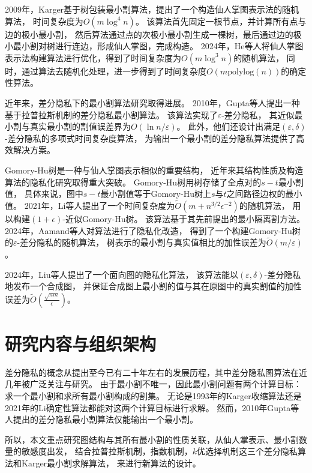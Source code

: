 2009年，Karger基于树包装最小割算法，提出了一个构造仙人掌图表示法的随机算法，
时间复杂度为$O(m\log^4n)$。\cite{karger2009near}
该算法首先固定一根节点，并计算所有点与边的极小最小割，
然后算法通过点的次极小最小割生成一棵树，最后通过边的极小最小割对树进行连边，形成仙人掌图，完成构造。
2024年，He等人将仙人掌图表示法构建算法进行优化，得到了时间复杂度为$O(m\log^3n)$的随机算法，
同时，通过算法去随机化处理，进一步得到了时间复杂度$O(m\text{polylog}(n))$的确定性算法。\cite{he2024cactus}

近年来，差分隐私下的最小割算法研究取得进展。
2010年，Gupta等人提出一种基于拉普拉斯机制的差分隐私最小割算法。\cite{gupta2010differentially}
该算法实现了$\varepsilon$-差分隐私，
其近似最小割与真实最小割的割值误差界为$O(\ln n/\varepsilon)$。
此外，他们还设计出满足$(\varepsilon,\delta)$-差分隐私的多项式时间复杂度算法，
为输出一个最小割的差分隐私算法提供了高效解决方案。

Gomory-Hu树是一种与仙人掌图表示相似的重要结构，
近年来其结构性质及构造算法的隐私化研究取得重大突破。
Gomory-Hu树用树存储了全点对的$s-t$最小割值，
具体来说，图中$s-t$最小割值等于Gomory-Hu树上$s$与$t$之间路径边权的最小值。
2021年，Li等人提出了一个时间复杂度为$\tilde O(m+n^{3/2}\epsilon^{-2})$的随机算法，
用以构建$(1+\epsilon)$-近似Gomory-Hu树。\cite{li2021approximate}
该算法基于其先前提出的最小隔离割方法。\cite{li2020deterministic}
2024年，Aamand等人对算法进行了隐私化改造，
得到了一个构建Gomory-Hu树的$\varepsilon$-差分隐私的随机算法，
树表示的最小割与真实值相比的加性误差为$\tilde O(m/\varepsilon)$。\cite{li2021approximate}

2024年，Liu等人提出了一个面向图的隐私化算法，
该算法能以$(\varepsilon,\delta)$-差分隐私地发布一个合成图，
并保证合成图上最小割的值与其在原图中的真实割值的加性误差为$\tilde O(\frac{\sqrt {nm}}{\epsilon})$。\cite{liu2024optimal}

\section{研究内容与组织架构}

差分隐私的概念从提出至今已有二十年左右的发展历程，其中差分隐私图算法在近几年被广泛关注与研究。
由于最小割不唯一，因此最小割问题有两个计算目标：求一个最小割和求所有最小割构成的割集。
无论是1993年的Karger收缩算法还是2021年的Li确定性算法都能对这两个计算目标进行求解。
然而，2010年Gupta等人提出的差分隐私最小割算法仅能输出一个最小割。

所以，本文重点研究图结构与其所有最小割的性质关联，从仙人掌表示、最小割数量的敏感度出发，
结合拉普拉斯机制，指数机制，$k$优选择机制这三个差分隐私算法和Karger最小割求解算法，
来进行新算法的设计。


